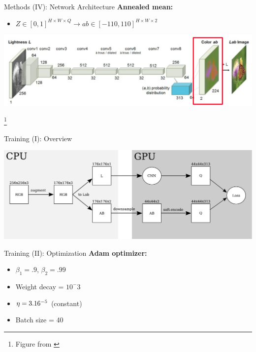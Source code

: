 \documentclass{beamer}
\newcommand\blfootnote[1]{%
  \begingroup
  \renewcommand\thefootnote{}\footnote{#1}%
  \addtocounter{footnote}{-1}%
  \endgroup
}
\begin{document}
\begin{frame}{Methods (IV): Network Architecture}
  \textbf{Annealed mean:}
    \begin{itemize}
      \item $Z \in [0, 1]^{H \times W \times Q} \rightarrow ab \in [-110,110]^{H \times W \times 2}$
    \end{itemize}

  \medskip

  \includegraphics[width=\linewidth]{resources/network4.jpg}

  \blfootnote{Figure from \cite{Zhang2016}}
\end{frame}


\begin{frame}{Training (I): Overview}
  \begin{center}
    \includegraphics[width=\textwidth]{resources/training.pdf}
  \end{center}
\end{frame}

\begin{frame}{Training (II): Optimization}
  \textbf{Adam optimizer:}
     \begin{itemize}
       \item $\beta_1 = .9$, $\beta_2 = .99$
       \item Weight decay = $10^-3$
       \item $\eta = 3.16 \time 10^{-5}$ (constant)
       \item Batch size = 40
     \end{itemize}
\end{frame}
\end{document}
